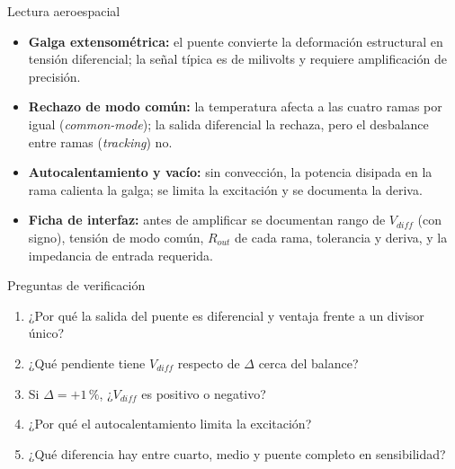 \documentclass[aspectratio=169]{beamer}
\begin{document}
\begin{frame}{Lectura aeroespacial}
  \begin{itemize}
    \item \textbf{Galga extensométrica:} el puente convierte la deformación estructural en tensión
      diferencial; la señal típica es de milivolts y requiere amplificación de precisión.
    \item \textbf{Rechazo de modo común:} la temperatura afecta a las cuatro ramas por igual
      (\emph{common-mode}); la salida diferencial la rechaza, pero el desbalance entre ramas (\emph{tracking}) no.
    \item \textbf{Autocalentamiento y vacío:} sin convección, la potencia disipada en la rama calienta
      la galga; se limita la excitación y se documenta la deriva.
    \item \textbf{Ficha de interfaz:} antes de amplificar se documentan rango de $V_{diff}$ (con signo),
      tensión de modo común, $R_{out}$ de cada rama, tolerancia y deriva, y la impedancia de entrada requerida.
  \end{itemize}
\end{frame}

\begin{frame}{Preguntas de verificación}
  \begin{enumerate}
    \item ¿Por qué la salida del puente es diferencial y ventaja frente a un divisor único?
    \item ¿Qué pendiente tiene $V_{diff}$ respecto de $\Delta$ cerca del balance?
    \item Si $\Delta = +1\,\text{\%}$, ¿$V_{diff}$ es positivo o negativo?
    \item ¿Por qué el autocalentamiento limita la excitación?
    \item ¿Qué diferencia hay entre cuarto, medio y puente completo en sensibilidad?
  \end{enumerate}
\end{frame}
\end{document}
